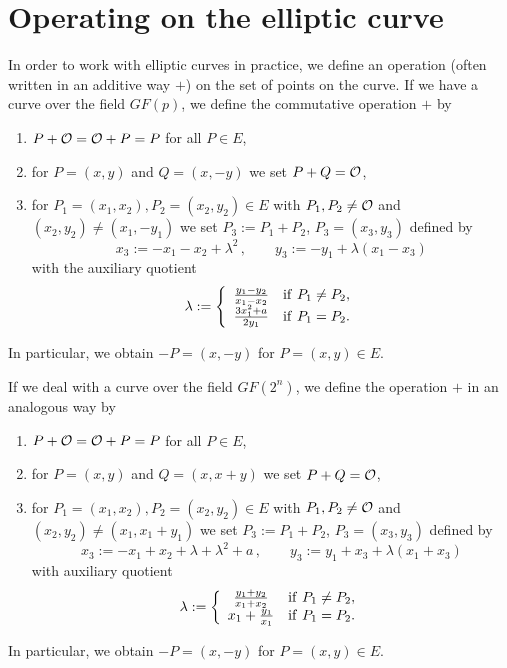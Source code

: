 \section{Operating on the elliptic curve}

In order to work with elliptic curves in practice, we define an operation (often written in an additive way $+$) on the set of points on the curve. If we have a curve over the field $GF(p)$, we define the commutative operation $+$ by
\begin{enumerate}
\item $P+{\cal O}={\cal O}+P=P$ for all $P\in E$,
\item for $P=(x,y)$ and $Q=(x,-y)$ we set $P+Q={\cal O}$,
\item for $P_1=(x_1,x_2),P_2=(x_2,y_2)\in E$ with $P_1,P_2\ne {\cal O}$ and $(x_2,y_2)\ne (x_1,-y_1)$ we set $P_3:=P_1+P_2$, $P_3=(x_3,y_3)$ defined by
$$ x_3:=-x_1-x_2+\lambda^2 \, , \qquad y_3:=-y_1+\lambda (x_1-x_3)
$$
with the auxiliary quotient
$$ \lambda:=\left\{ \begin{array}{cl} {y_1-y_2\over x_1-x_2} & {\rm if~} P_1\ne P_2, \\
                                     {3x_1^2+a\over 2y_1} & {\rm if~} P_1=P_2. \end{array} \right.
$$
\end{enumerate}
In particular, we obtain $-P=(x,-y)$ for $P=(x,y)\in E$.

If we deal with a curve over the field $GF(2^n)$, we define the operation $+$ in an analogous way by
\begin{enumerate}
\item $P+{\cal O}={\cal O}+P=P$ for all $P\in E$,
\item for $P=(x,y)$ and $Q=(x,x+y)$ we set $P+Q={\cal O}$,
\item for $P_1=(x_1,x_2),P_2=(x_2,y_2)\in E$ with $P_1,P_2\ne {\cal O}$ and $(x_2,y_2)\ne (x_1,x_1+y_1)$ we set $P_3:=P_1+P_2$, $P_3=(x_3,y_3)$ defined by
$$ x_3:=-x_1+x_2+\lambda+\lambda^2+a \, , \qquad y_3:=y_1+x_3+\lambda (x_1+x_3)
$$
with auxiliary quotient
$$ \lambda:=\left\{ \begin{array}{cl} {y_1+y_2\over x_1+x_2} & {\rm if~} P_1\ne P_2, \\
                                   x_1+{y_1\over x_1} & {\rm if~} P_1=P_2. \end{array}\right.
$$
\end{enumerate}
In particular, we obtain $-P=(x,-y)$ for $P=(x,y)\in E$.

